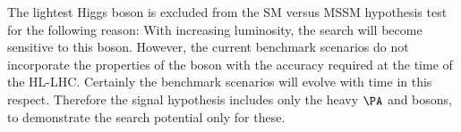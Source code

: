 The lightest Higgs boson \Ph is excluded from the SM versus MSSM hypothesis test for the following reason: 
With increasing luminosity, the search will become sensitive to this boson. However, the current benchmark scenarios do not 
incorporate the properties of the \Ph boson with the accuracy required at the time of the HL-LHC. 
Certainly the benchmark scenarios will evolve with time in this respect. Therefore the signal hypothesis includes 
only the heavy $\PA$ and \PH bosons, to demonstrate the search potential only for these.
%
